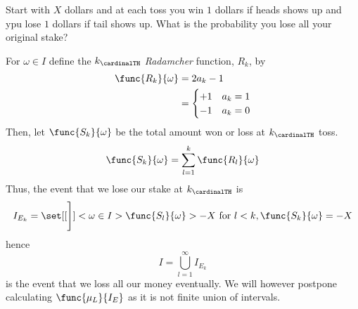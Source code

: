 \begin{example}
    Start with \(X\) dollars and at each toss you win \(1\) dollars if heads shows up and ypu lose \(1\) dollars if tail shows up. What is the probability you lose all your original stake?

    For \(\omega \in I\) define the \(k_{\cardinalTH}\) \textit{Radamcher} function, \(R_k\), by 
    \begin{align*}
        \func{R_k}{\omega} &= 2a_k - 1\\
        &= \begin{cases}
            +1 & a_k = 1\\
            -1 & a_k = 0
        \end{cases}
    \end{align*}
    Then, let \(\func{S_k}{\omega}\) be the total amount won or loss at \(k_{\cardinalTH}\) toss.
    \begin{equation*}
        \func{S_k}{\omega} = \sum_{l = 1}^k \func{R_l}{\omega}
    \end{equation*}
    Thus, the event that we lose our stake at \(k_{\cardinalTH}\) is 
    \begin{equation*}
        I_{E_k} = \set[[\Bigg]]<\omega \in I>{\func{S_l}{\omega} > -X \ \mathrm{for} \ l < k, \func{S_k}{\omega} = -X}
    \end{equation*}
    hence 
    \begin{equation*}
        I = \bigcup_{l = 1}^{\infty} I_{E_k}
    \end{equation*}
    is the event that we loss all our money eventually. We will however postpone calculating \(\func{\mu_L}{I_E}\) as it is not finite union of intervals.
\end{example}


